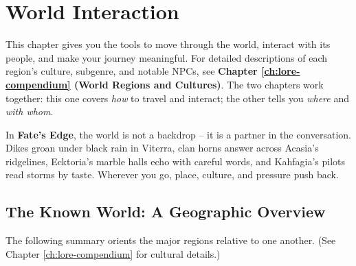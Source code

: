\chapter{World Interaction}
\label{ch:world-interaction}

\begin{tcolorbox}[colback=blue!5!white, colframe=blue!75!black, title=Using This Chapter,breakable]
This chapter gives you the tools to move through the world, interact with its people, and make your journey meaningful. For detailed descriptions of each region's culture, subgenre, and notable NPCs, see \textbf{Chapter \ref{ch:lore-compendium} (World Regions and Cultures)}. The two chapters work together: this one covers \emph{how} to travel and interact; the other tells you \emph{where} and \emph{with whom}.
\end{tcolorbox}

In \textbf{Fate's Edge}, the world is not a backdrop -- it is a partner in the conversation. Dikes groan under black rain in Viterra, clan horns answer across Acasia's ridgelines, Ecktoria's marble halls echo with careful words, and Kahfagia's pilots read storms by taste. Wherever you go, place, culture, and pressure push back.

\section{The Known World: A Geographic Overview}
\label{sec:known-world}

The following summary orients the major regions relative to one another. (See Chapter \ref{ch:lore-compendium} for cultural details.)

